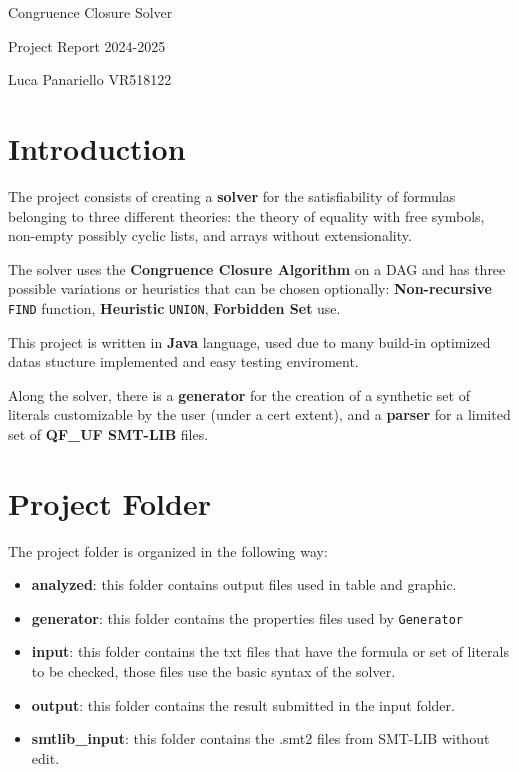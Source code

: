 \documentclass[11pt,a4paper]{article}
\begin{document}
    
    \begin{center}
        \Huge Congruence Closure Solver

        \LARGE Project Report 2024-2025

        \Large {Luca Panariello VR518122}
    \end{center}

    \vspace{0.5em}

    \section{Introduction}

    The project consists of creating a \textbf{solver} for the satisfiability of formulas belonging to three different theories: the theory of equality with free symbols, non-empty possibly cyclic lists, and arrays without extensionality.

    The solver uses the \textbf{Congruence Closure Algorithm} on a DAG and has three possible variations or heuristics that can be chosen optionally:
    \textbf{Non-recursive} \texttt{FIND} function, \textbf{Heuristic} \texttt{UNION}, \textbf{Forbidden Set} use.

    This project is written in \textbf{Java} language, used due to many build-in optimized datas stucture implemented and easy testing enviroment. 

    Along the solver, there is a \textbf{generator} for the creation of a synthetic set of literals customizable by the user (under a cert extent), and a \textbf{parser} for a limited set of \textbf{QF\_UF SMT-LIB} files.

    \section{Project Folder}
    The project folder is organized in the following way:
    \begin{itemize}
        \item \textbf{analyzed}: this folder contains output files used in table and graphic.
        \item \textbf{generator}: this folder contains the properties files used by \texttt{Generator}
        \item \textbf{input}: this folder contains the txt files that have the formula or set of literals to be checked, those files use the basic syntax of the solver.
        \item \textbf{output}: this folder contains the result submitted in the input folder.
        \item \textbf{smtlib\_input}: this folder contains the .smt2 files from SMT-LIB without edit.
    \end{itemize}
\end{document}
